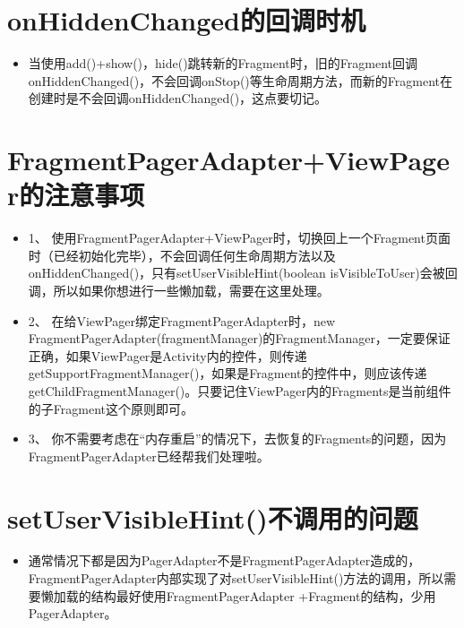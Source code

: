 \documentclass[9pt, b5paaper]{book}
\begin{document}
\section{onHiddenChanged的回调时机}
\label{sec-2-5}
\begin{itemize}
\item 当使用add()+show()，hide()跳转新的Fragment时，旧的Fragment回调onHiddenChanged()，不会回调onStop()等生命周期方法，而新的Fragment在创建时是不会回调onHiddenChanged()，这点要切记。
\end{itemize}
\section{FragmentPagerAdapter+ViewPager的注意事项}
\label{sec-2-6}
\begin{itemize}
\item 1、 使用FragmentPagerAdapter+ViewPager时，切换回上一个Fragment页面时（已经初始化完毕），不会回调任何生命周期方法以及onHiddenChanged()，只有setUserVisibleHint(boolean isVisibleToUser)会被回调，所以如果你想进行一些懒加载，需要在这里处理。
\item 2、 在给ViewPager绑定FragmentPagerAdapter时，new FragmentPagerAdapter(fragmentManager)的FragmentManager，一定要保证正确，如果ViewPager是Activity内的控件，则传递getSupportFragmentManager()，如果是Fragment的控件中，则应该传递getChildFragmentManager()。只要记住ViewPager内的Fragments是当前组件的子Fragment这个原则即可。
\item 3、 你不需要考虑在“内存重启”的情况下，去恢复的Fragments的问题，因为FragmentPagerAdapter已经帮我们处理啦。
\end{itemize}
\section{setUserVisibleHint()不调用的问题}
\label{sec-2-7}
\begin{itemize}
\item 通常情况下都是因为PagerAdapter不是FragmentPagerAdapter造成的，FragmentPagerAdapter内部实现了对setUserVisibleHint()方法的调用，所以需要懒加载的结构最好使用FragmentPagerAdapter +Fragment的结构，少用PagerAdapter。
\end{itemize}
\end{document}
